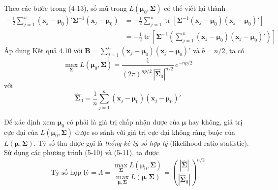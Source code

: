 Theo các bước trong (4-13), số mũ trong $L(\boldsymbol{\mu}_0,\boldsymbol{\Sigma})$ có thể viết lại thành
\begin{align*}
-\frac{1}{2}\sum_{j=1}^{n}(\mathbf{x}_j-\boldsymbol{\mu}_0)'\boldsymbol{\Sigma}^{-1}(\mathbf{x}_j-\boldsymbol{\mu}_0)
&= -\frac{1}{2}\sum_{j=1}^{n}\operatorname{tr}\!\left[\boldsymbol{\Sigma}^{-1}(\mathbf{x}_j-\boldsymbol{\mu}_0)(\mathbf{x}_j-\boldsymbol{\mu}_0)'\right]\\
&= -\frac{1}{2}\operatorname{tr}\!\left[\boldsymbol{\Sigma}^{-1}\left(\sum_{j=1}^{n}(\mathbf{x}_j-\boldsymbol{\mu}_0)(\mathbf{x}_j-\boldsymbol{\mu}_0)'\right)\right]
\end{align*}
Áp dụng Kết quả 4.10 với $\mathbf{B}=\sum_{j=1}^{n}(\mathbf{x}_j-\boldsymbol{\mu}_0)(\mathbf{x}_j-\boldsymbol{\mu}_0)'$ và $b=n/2$, ta có
\begin{equation}
\max_{\boldsymbol{\Sigma}} L(\boldsymbol{\mu}_0,\boldsymbol{\Sigma}) = \frac{1}{(2\pi)^{np/2}\,|\hat{\boldsymbol{\Sigma}}_0|^{n/2}}\, e^{-np/2}
\tag{5-11}
\end{equation}
với
\[
\hat{\boldsymbol{\Sigma}}_0 = \frac{1}{n}\sum_{j=1}^{n}(\mathbf{x}_j-\boldsymbol{\mu}_0)(\mathbf{x}_j-\boldsymbol{\mu}_0)'
\]

Để xác định xem $\boldsymbol{\mu}_0$ có phải là giá trị chấp nhận được của $\boldsymbol{\mu}$ hay không, giá trị cực đại của $L(\boldsymbol{\mu}_0,\boldsymbol{\Sigma})$ được so sánh với giá trị cực đại không ràng buộc của $L(\boldsymbol{\mu},\boldsymbol{\Sigma})$. Tỷ số thu được gọi là \emph{thống kê tỷ số hợp lý} (likelihood ratio statistic). Sử dụng các phương trình (5-10) và (5-11), ta được
\begin{equation}
\text{Tỷ số hợp lý} = \Lambda = \frac{\max\limits_{\boldsymbol{\Sigma}} L(\boldsymbol{\mu}_0,\boldsymbol{\Sigma})}{\max\limits_{\boldsymbol{\mu},\boldsymbol{\Sigma}} L(\boldsymbol{\mu},\boldsymbol{\Sigma})}
= \left(\frac{|\hat{\boldsymbol{\Sigma}}|}{|\hat{\boldsymbol{\Sigma}}_0|}\right)^{n/2}
\tag{5-12}
\end{equation}

